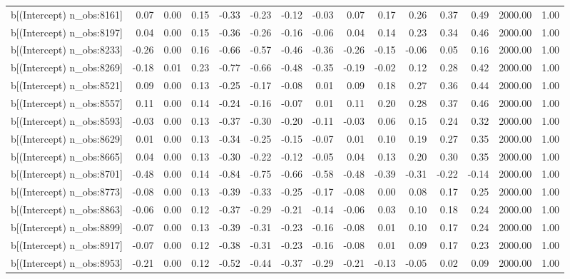 \begin{table}[ht]
\begin{tabular}{rrrrrrrrrrrrrrr}
  b[(Intercept) n\_obs:8161] & 0.07 & 0.00 & 0.15 & -0.33 & -0.23 & -0.12 & -0.03 & 0.07 & 0.17 & 0.26 & 0.37 & 0.49 & 2000.00 & 1.00 \\ 
  b[(Intercept) n\_obs:8197] & 0.04 & 0.00 & 0.15 & -0.36 & -0.26 & -0.16 & -0.06 & 0.04 & 0.14 & 0.23 & 0.34 & 0.46 & 2000.00 & 1.00 \\ 
  b[(Intercept) n\_obs:8233] & -0.26 & 0.00 & 0.16 & -0.66 & -0.57 & -0.46 & -0.36 & -0.26 & -0.15 & -0.06 & 0.05 & 0.16 & 2000.00 & 1.00 \\ 
  b[(Intercept) n\_obs:8269] & -0.18 & 0.01 & 0.23 & -0.77 & -0.66 & -0.48 & -0.35 & -0.19 & -0.02 & 0.12 & 0.28 & 0.42 & 2000.00 & 1.00 \\ 
  b[(Intercept) n\_obs:8521] & 0.09 & 0.00 & 0.13 & -0.25 & -0.17 & -0.08 & 0.01 & 0.09 & 0.18 & 0.27 & 0.36 & 0.44 & 2000.00 & 1.00 \\ 
  b[(Intercept) n\_obs:8557] & 0.11 & 0.00 & 0.14 & -0.24 & -0.16 & -0.07 & 0.01 & 0.11 & 0.20 & 0.28 & 0.37 & 0.46 & 2000.00 & 1.00 \\ 
  b[(Intercept) n\_obs:8593] & -0.03 & 0.00 & 0.13 & -0.37 & -0.30 & -0.20 & -0.11 & -0.03 & 0.06 & 0.15 & 0.24 & 0.32 & 2000.00 & 1.00 \\ 
  b[(Intercept) n\_obs:8629] & 0.01 & 0.00 & 0.13 & -0.34 & -0.25 & -0.15 & -0.07 & 0.01 & 0.10 & 0.19 & 0.27 & 0.35 & 2000.00 & 1.00 \\ 
  b[(Intercept) n\_obs:8665] & 0.04 & 0.00 & 0.13 & -0.30 & -0.22 & -0.12 & -0.05 & 0.04 & 0.13 & 0.20 & 0.30 & 0.35 & 2000.00 & 1.00 \\ 
  b[(Intercept) n\_obs:8701] & -0.48 & 0.00 & 0.14 & -0.84 & -0.75 & -0.66 & -0.58 & -0.48 & -0.39 & -0.31 & -0.22 & -0.14 & 2000.00 & 1.00 \\ 
  b[(Intercept) n\_obs:8773] & -0.08 & 0.00 & 0.13 & -0.39 & -0.33 & -0.25 & -0.17 & -0.08 & 0.00 & 0.08 & 0.17 & 0.25 & 2000.00 & 1.00 \\ 
  b[(Intercept) n\_obs:8863] & -0.06 & 0.00 & 0.12 & -0.37 & -0.29 & -0.21 & -0.14 & -0.06 & 0.03 & 0.10 & 0.18 & 0.24 & 2000.00 & 1.00 \\ 
  b[(Intercept) n\_obs:8899] & -0.07 & 0.00 & 0.13 & -0.39 & -0.31 & -0.23 & -0.16 & -0.08 & 0.01 & 0.10 & 0.17 & 0.24 & 2000.00 & 1.00 \\ 
  b[(Intercept) n\_obs:8917] & -0.07 & 0.00 & 0.12 & -0.38 & -0.31 & -0.23 & -0.16 & -0.08 & 0.01 & 0.09 & 0.17 & 0.23 & 2000.00 & 1.00 \\ 
  b[(Intercept) n\_obs:8953] & -0.21 & 0.00 & 0.12 & -0.52 & -0.44 & -0.37 & -0.29 & -0.21 & -0.13 & -0.05 & 0.02 & 0.09 & 2000.00 & 1.00 \\ 

\end{tabular}
\end{table}
